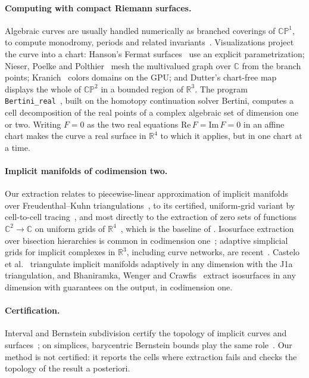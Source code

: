 \documentclass[11pt]{article}
\theoremstyle{plain}
\theoremstyle{definition}
\theoremstyle{remark}
\newcommand{\CP}{\mathbb{CP}}
\newcommand{\R}{\mathbb{R}}
\newcommand{\C}{\mathbb{C}}
\begin{document}
\paragraph{Computing with compact Riemann surfaces.}
Algebraic curves are usually handled numerically as branched coverings
of $\CP^1$, to compute monodromy, periods and related invariants~\cite{deconinckvanhoeij2001,bobenkoklein2013}.
Visualizations project the curve into a chart: Hanson's Fermat
surfaces~\cite{hanson1994} use an explicit parametrization;
Nieser, Poelke and Polthier~\cite{nieser2010} mesh the multivalued graph
over $\C$ from the branch points; Kranich~\cite{kranich2016} colors
domains on the GPU; and Dutter's chart-free map~\cite{dutter2026}
displays the whole of $\CP^2$ in a bounded region of $\R^3$.
The program \texttt{Bertini\_real}~\cite{bertinireal2017}, built on the
homotopy continuation solver Bertini, computes a cell decomposition of the real points of a complex algebraic set of
dimension one or two. Writing $F=0$ as the two real equations
$\mathrm{Re}\,F=\mathrm{Im}\,F=0$ in an affine chart makes the curve a real
surface in $\R^4$ to which it applies, but in one chart at a time.

\paragraph{Implicit manifolds of codimension two.}
Our extraction relates to piecewise-linear approximation of implicit
manifolds over Freudenthal--Kuhn
triangulations~\cite{allgowerschmidt1985,allgowergeorg2003}, to its
certified, uniform-grid variant by cell-to-cell
tracing~\cite{bkw2023,boissonnatwintraecken2022}, and most directly to
the extraction of zero sets of functions $\C^2\to\C$ on uniform grids of
$\R^4$~\cite{weiglebanks1996}, which is the baseline of
. Isosurface extraction over bisection hierarchies
is common in codimension one~\cite{gerstnerrumpf2000,pascucci2002};
adaptive simplicial grids for implicit complexes in $\R^3$, including
curve networks, are recent~\cite{ju2024}. Castelo et al.~\cite{castelo2006} triangulate implicit
manifolds adaptively in any dimension with the J1a triangulation, and
Bhaniramka, Wenger and Crawfis~\cite{bwc2004} extract isosurfaces in any
dimension with guarantees on the output, in codimension one.

\paragraph{Certification.}
Interval and Bernstein subdivision certify the topology of implicit
curves and surfaces~\cite{plantingavegter2004,mourrainpavone2009};
on simplices, barycentric Bernstein bounds play the same
role~\cite{reuter2008}. Our method is not certified: it reports the cells where extraction fails and checks the
topology of the result a posteriori.
\end{document}
